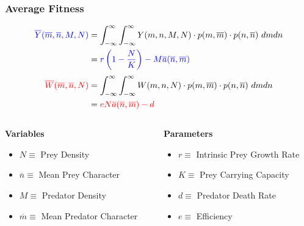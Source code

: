 \documentclass[10pt]{beamer}
\begin{document}
\begin{frame}
	\frametitle{Average Fitness}
	\begin{align*}
	{\color{blue}\overline{Y}(\overline{m}, \overline{n}, M, N)} &= \int_{-\infty}^{\infty}\int_{-\infty}^{\infty} Y(m, n, M, N) \cdot p(m, \overline{m}) \cdot p(n, \overline{n})\ dm dn \\
	&= {\color{blue}r\left(1 - \frac{N}{K}\right) - M\overline{a}(\overline{n}, \overline{m})} \\[.1cm]
	{\color{red}\overline{W}(\overline{m}, \overline{n}, N)} &= \int_{-\infty}^{\infty}\int_{-\infty}^{\infty} W(m, n, N) \cdot p(m, \overline{m}) \cdot p(n, \overline{n})\ dm dn \\
	&= {\color{red}eN\overline{a}(\overline{n}, \overline{m}) - d}
	\end{align*}
	\begin{columns}
		\begin{column}{0.5\textwidth}
			{\bf Variables}
			\begin{itemize}
				\item {\color{blue}$N \equiv $ Prey Density}
				\item {\color{blue}$\overline{n} \equiv $ Mean Prey Character}
				\item {\color{red}$M \equiv $ Predator Density}
				\item {\color{red}$\overline{m} \equiv $ Mean Predator Character}
			\end{itemize}
		\end{column}
		\begin{column}{0.5\textwidth}
			{\bf Parameters}
			\begin{itemize}
				\item $r \equiv $ Intrinsic Prey Growth Rate
				\item $K \equiv $ Prey Carrying Capacity
				\item $d \equiv $ Predator Death Rate
				\item $e \equiv $ Efficiency
			\end{itemize}
		\end{column}
	\end{columns}
\end{frame}
\end{document}
